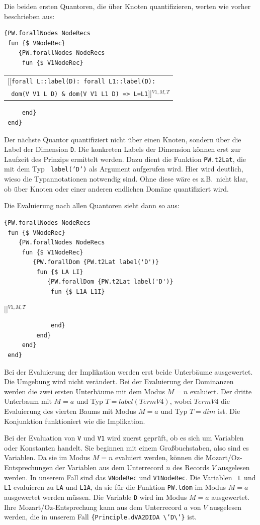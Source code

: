 Die beiden ersten Quantoren, die \"uber Knoten quantifizieren, werten
wie vorher beschrieben aus:
\begin{verbatim}
{PW.forallNodes NodeRecs
 fun {$ VNodeRec}
    {PW.forallNodes NodeRecs
     fun {$ V1NodeRec}
\end{verbatim}
\begin{tabular}{l}
  [\![\texttt{forall L::label(D): forall L1::label(D):}\\
      \texttt{ dom(V V1 L D) \& dom(V V1 L1 D) => L=L1}]\!]$^{V1,M,T}$
\end{tabular}
\begin{verbatim}
     end}
 end}
\end{verbatim}
Der n\"achste Quantor quantifiziert nicht \"uber einen Knoten, sondern
\"uber die Label der Dimension {\tt D}.  Die konkreten Labels der
Dimension k\"onnen erst zur Laufzeit des Prinzips ermittelt werden.
Dazu dient die Funktion {\tt PW.t2Lat}, die mit dem Typ {\tt
  label('D')} als Argument aufgerufen wird.  Hier wird deutlich, wieso
die Typannotationen notwendig sind. Ohne diese w\"are es z.B.\ nicht
klar, ob \"uber Knoten oder einer anderen endlichen Dom\"ane
quantifiziert wird.

Die Evaluierung nach allen Quantoren sieht dann so aus:
\begin{verbatim}
{PW.forallNodes NodeRecs
 fun {$ VNodeRec}
    {PW.forallNodes NodeRecs
     fun {$ V1NodeRec}
        {PW.forallDom {PW.t2Lat label('D')}
         fun {$ LA LI}
            {PW.forallDom {PW.t2Lat label('D')}
             fun {$ L1A L1I}
\end{verbatim}
        [\![\texttt{dom(V V1 L D) \& dom(V V1 L1 D) => L=L1}]\!]$^{V1,M,T}$
\begin{verbatim}
             end}
         end}
     end}
 end}
\end{verbatim}

Bei der Evaluierung der Implikation werden erst beide Unterb\"aume
ausgewertet. Die Umgebung wird nicht ver\"andert. Bei der Evaluierung der
Dominanzen werden die zwei ersten Unterb\"aume mit dem Modus $M=n$
evaluiert. Der dritte Unterbaum mit $M=a$ und Typ $T=\mathit{label(TermV4)}$,
wobei $\mathit{TermV4}$ die Evaluierung des vierten Baums mit Modus $M=a$ und
Typ $T=\mathit{dim}$ ist. Die Konjunktion funktioniert wie die Implikation.

Bei der Evaluation von {\tt V} und {\tt V1} wird zuerst gepr\"uft, ob
es sich um Variablen oder Konstanten handelt. Sie beginnen mit einem
Gro{\ss}buchstaben, also sind es Variablen. Da sie im Modus $M=n$
evaluiert werden, k\"onnen die Mozart/Oz-Entsprechungen der Variablen
aus dem Unterrecord $n$ des Records $V$ ausgelesen werden. In unserem
Fall sind das {\tt VNodeRec} und {\tt V1NodeRec}.  Die Variablen {\tt
  L} und {\tt L1} evaluieren zu {\tt LA} und {\tt L1A}, da sie f\"ur
die Funktion {\tt PW.ldom} im Modus $M=a$ ausgewertet werden m\"ussen.
Die Variable {\tt D} wird im Modus $M=a$ ausgewertet. Ihre
Mozart/Oz-Entsprechung kann aus dem Unterrecord $a$ von $V$ ausgelesen
werden, die in unserem Fall {\tt \{Principle.dVA2DIDA
  \verb=\='D\verb=\='\}} ist.

